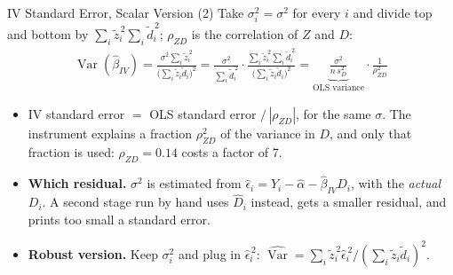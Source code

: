 \documentclass[aspectratio=169,11pt,xcolor=dvipsnames]{beamer}
\DeclareMathOperator{\Var}{Var}
\begin{document}
\begin{frame}{IV Standard Error, Scalar Version (2)}
Take $\sigma_i^2 = \sigma^2$ for every $i$ and divide top and bottom by
$\sum_i \tilde z_i^{\,2}\sum_i \tilde d_i^{\,2}$; $\rho_{ZD}$ is the correlation of $Z$ and $D$:
\begin{align*}
  \Var(\hat\beta_{IV}) = \frac{\sigma^2 \sum_i \tilde z_i^{\,2}}{\big(\sum_i \tilde z_i\tilde d_i\big)^2}
  = \frac{\sigma^2}{\sum_i \tilde d_i^{\,2}}\cdot
    \frac{\sum_i \tilde z_i^{\,2}\sum_i \tilde d_i^{\,2}}{\big(\sum_i \tilde z_i\tilde d_i\big)^2}
  = \underbrace{\frac{\sigma^2}{n\,s_D^2}}_{\text{OLS variance}}\cdot\frac{1}{\rho_{ZD}^2}
\end{align*}
\begin{itemize}\itemsep3pt
  \item \alert{IV standard error $=$ OLS standard error $/\,|\rho_{ZD}|$}, for the
        same $\sigma$. The instrument explains a fraction $\rho_{ZD}^2$ of the
        variance in $D$, and only that fraction is used: $\rho_{ZD} = 0.14$
        costs a factor of 7.
  \item \textbf{Which residual.} $\sigma^2$ is estimated from
        $\hat\epsilon_i = Y_i - \hat\alpha - \hat\beta_{IV} D_i$, with the
        \emph{actual} $D_i$. A second stage run by hand uses $\hat D_i$ instead,
        gets a smaller residual, and prints too small a standard error.
  \item \textbf{Robust version.} Keep $\sigma_i^2$ and plug in $\hat\epsilon_i^{\,2}$:
        $\widehat{\Var} = \sum_i \tilde z_i^{\,2}\hat\epsilon_i^{\,2}/(\sum_i \tilde z_i\tilde d_i)^2$.
\end{itemize}
\end{frame}
\end{document}
